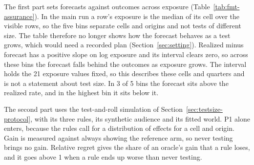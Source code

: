 The first part sets forecasts against outcomes across exposure (Table~\ref{tab:fmt-assurance}). In the main run a row's exposure is the median of its cell over the visible rows, so the five bins separate cells and origins and not tests of different size. The table therefore no longer shows how the forecast behaves as a test grows, which would need a recorded plan (Section~\ref{sec:setting}).
Realized minus forecast has a positive slope on log exposure and its interval clears zero, so across these bins the forecast falls behind the outcomes as exposure grows. The interval holds the 21 exposure values fixed, so this describes these cells and quarters and is not a statement about test size.
In 3 of 5 bins the forecast sits above the realized rate, and in the highest bin it sits below it.

\begin{table}[t]\centering\scriptsize
\caption{Forecast probability of a significant positive result set against the realized rate in five equal-mass bins of exposure, pooled over cells, headline archive. In the main run exposure is one number per cell and origin, so a bin groups cells and origins. Every rung has the same realized rate and the same mean exposure. The slope shown is the slope of realized minus forecast on standardized log exposure.}
\label{tab:fmt-assurance}
\resizebox{\columnwidth}{!}{%
}
\end{table}

The second part uses the test-and-roll simulation of Section~\ref{sec:testsize-protocol}, with its three rules, its synthetic audience and its fitted world. P1 alone enters, because the rules call for a distribution of effects for a cell and origin. Gain is measured against always showing the reference arm, so never testing brings no gain. Relative regret gives the share of an oracle's gain that a rule loses, and it goes above 1 when a rule ends up worse than never testing.

